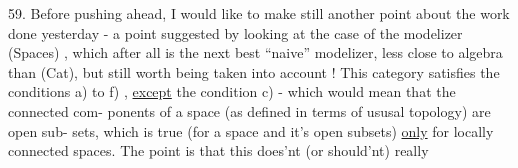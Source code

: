 59. Before pushing ahead, I would like to make still another point
about the work done yesterday - a point suggested by looking at the
case of the modelizer (Spaces) , which after all is the next best
``naive'' modelizer, less close to algebra than (Cat), but still worth
being taken into account ! This category satisfies the conditions a) to
f) , \uline{except} the condition c) - which would mean that the connected com-%
ponents of a space (as defined in terms of ususal topology) are open sub-%
sets, which is true (for a space and it's open subsets) \uline{only} for locally
connected spaces. The point is that this does'nt (or should'nt) really

